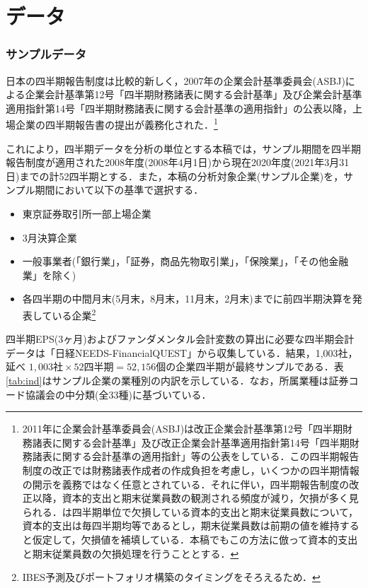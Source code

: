 \documentclass[a4paper，12pt]{jsarticle}
\begin{document}
\part{データ} \label{par:data}

\section{サンプルデータ} \label{sec:sample}

日本の四半期報告制度は比較的新しく，2007年の企業会計基準委員会(ASBJ)による企業会計基準第12号「四半期財務諸表に関する会計基準」及び企業会計基準適用指針第14号「四半期財務諸表に関する会計基準の適用指針」の公表以降，上場企業の四半期報告書の提出が義務化された．\footnote{2011年に企業会計基準委員会(ASBJ)は改正企業会計基準第12号「四半期財務諸表に関する会計基準」及び改正企業会計基準適用指針第14号「四半期財務諸表に関する会計基準の適用指針」等の公表をしている．この四半期報告制度の改正では財務諸表作成者の作成負担を考慮し，いくつかの四半期情報の開示を義務ではなく任意とされている．それに伴い，四半期報告制度の改正以降，資本的支出と期末従業員数の観測される頻度が減り，欠損が多く見られる．\cite{zhang2004neural}は四半期単位で欠損している資本的支出と期末従業員数について，資本的支出は毎四半期均等であるとし，期末従業員数は前期の値を維持すると仮定して，欠損値を補填している．本稿でもこの方法に倣って資本的支出と期末従業員数の欠損処理を行うこととする．}

これにより，四半期データを分析の単位とする本稿では，サンプル期間を四半期報告制度が適用された2008年度(2008年4月1日)から現在2020年度(2021年3月31日)までの計52四半期とする．また，本稿の分析対象企業(サンプル企業)を，サンプル期間において以下の基準で選択する．

\begin{itemize}
  \item 東京証券取引所一部上場企業
  \item 3月決算企業
  \item 一般事業者(「銀行業」，「証券，商品先物取引業」，「保険業」，「その他金融業」を除く)
  \item 各四半期の中間月末(5月末，8月末，11月末，2月末)までに前四半期決算を発表している企業\footnote{IBES予測及びポートフォリオ構築のタイミングをそろえるため．}
\end{itemize}

四半期EPS(3ヶ月)およびファンダメンタル会計変数の算出に必要な四半期会計データは「日経NEEDS-FinancialQUEST」から収集している．結果，1,003社，延べ $1,003社 \times 52四半期 = 52,156個$の企業四半期が最終サンプルである．表\ref{tab:ind}はサンプル企業の業種別の内訳を示している．なお，所属業種は証券コード協議会の中分類(全33種)に基づいている．
\end{document}
